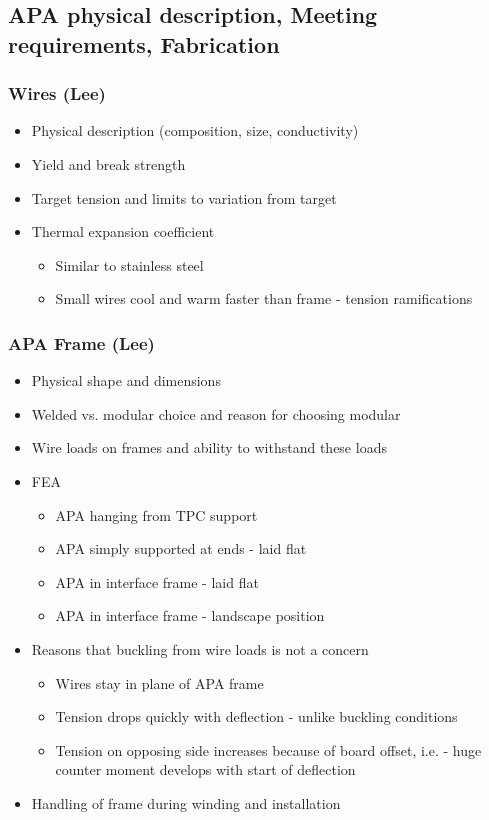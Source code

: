 \subsection{APA physical description, Meeting requirements, Fabrication}
\subsubsection{Wires (Lee)}
\begin{itemize}
\item{Physical description (composition, size, conductivity)}
\item{Yield and break strength}
\item{Target tension and limits to variation from target}
\item{Thermal expansion coefficient}
\begin{itemize}
\item{Similar to stainless steel}
\item{Small wires cool and warm faster than frame - tension ramifications}
\end{itemize} 
\end{itemize}

\subsubsection{APA Frame (Lee)}
\begin{itemize}
\item{Physical shape and dimensions}
\item{Welded vs. modular choice and reason for choosing modular}
\item{Wire loads on frames and ability to withstand these loads}
\item{FEA}
\begin{itemize}
\item{APA hanging from TPC support}
\item{APA simply supported at ends - laid flat}
\item{APA in interface frame - laid flat}
\item{APA in interface frame - landscape position}
\end{itemize}
\item{Reasons that buckling from wire loads is not a concern}
\begin{itemize}
\item{Wires stay in plane of APA frame}
\item{Tension drops quickly with deflection - unlike buckling conditions}
\item{Tension on opposing side increases because of board offset, i.e. - huge counter moment develops with start of deflection}
\end{itemize}
\item{Handling of frame during winding and installation}
\end{itemize}

